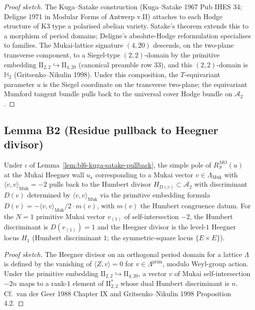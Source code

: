 \begin{proof}[Proof sketch]
The Kuga--Satake construction (Kuga--Satake 1967 Pub IHES 34;
Deligne 1971 in Modular Forms of Antwerp v.II) attaches to each
Hodge structure of K3 type a polarised abelian variety.  Satake's
theorem extends this to a morphism of period domains; Deligne's
absolute-Hodge reformulation specialises to families.  The
Mukai-lattice signature $(4, 20)$ descends, on the two-plane
transverse component, to a Siegel-type $(2, 2)$-domain by the
primitive embedding $\mathrm{II}_{2, 2} \hookrightarrow
\mathrm{II}_{4, 20}$ (canonical preamble row 33), and this
$(2, 2)$-domain is $\mathbb H_{2}$ (Gritsenko--Nikulin 1998).  Under
this composition, the $T$-equivariant parameter $u$ is
the Siegel coordinate on the transverse two-plane; the equivariant
Mumford tangent bundle pulls back to the universal cover Hodge
bundle on $\mathcal A_{2}$.
\end{proof}

\subsection*{Lemma B2 (Residue pullback to Heegner divisor)}

\begin{lemma}
\label{lem:bl6-residue-heegner}
Under $\iota$ of Lemma~\ref{lem:bl6-kuga-satake-pullback}, the simple
pole of $R^{MO}_{S}(u)$ at the Mukai Heegner wall $u_{\star}$
corresponding to a Mukai vector $v \in \Lambda_{\mathrm{Muk}}$ with
$\langle v, v \rangle_{\mathrm{Muk}} = -2$ pulls back to the Humbert
divisor $H_{D(v)} \subset \mathcal A_{2}$ with discriminant $D(v)$
determined by $\langle v, v \rangle_{\mathrm{Muk}}$ via the primitive
embedding formula
$D(v) = -\langle v, v \rangle_{\mathrm{Muk}} / 2 \cdot m(v)$, with
$m(v)$ the Humbert congruence datum.  For the $N = 1$ primitive
Mukai vector $v_{(1)}$ of self-intersection $-2$, the Humbert
discriminant is $D(v_{(1)}) = 1$ and the Heegner divisor is the
level-$1$ Heegner locus $H_{1}$ (Humbert discriminant $1$; the
symmetric-square locus $\{E \times E\}$).
\end{lemma}

\begin{proof}[Proof sketch]
The Heegner divisor on an orthogonal period domain for a lattice
$\Lambda$ is defined by the vanishing of
$\langle Z, v \rangle = 0$ for $v \in \Lambda^{\mathrm{prim}}$, modulo
Weyl-group action.  Under the primitive embedding $\mathrm{II}_{2, 2}
\hookrightarrow \mathrm{II}_{4, 20}$, a vector $v$ of Mukai
self-intersection $-2n$ maps to a rank-$1$ element of
$\mathrm{II}_{2, 2}^{*}$ whose dual Humbert discriminant is $n$.
Cf.\ van der Geer 1988 Chapter IX and Gritsenko--Nikulin 1998
Proposition 4.2.
\end{proof}

